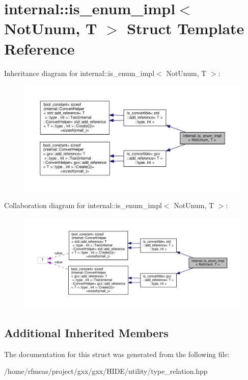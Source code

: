 \hypertarget{structinternal_1_1is__enum__impl}{}\section{internal\+:\+:is\+\_\+enum\+\_\+impl$<$ Not\+Unum, T $>$ Struct Template Reference}
\label{structinternal_1_1is__enum__impl}


Inheritance diagram for internal\+:\+:is\+\_\+enum\+\_\+impl$<$ Not\+Unum, T $>$\+:
\nopagebreak
\begin{figure}[H]
\begin{center}
\leavevmode
\includegraphics[width=350pt]{structinternal_1_1is__enum__impl__inherit__graph}
\end{center}
\end{figure}


Collaboration diagram for internal\+:\+:is\+\_\+enum\+\_\+impl$<$ Not\+Unum, T $>$\+:
\nopagebreak
\begin{figure}[H]
\begin{center}
\leavevmode
\includegraphics[width=350pt]{structinternal_1_1is__enum__impl__coll__graph}
\end{center}
\end{figure}
\subsection*{Additional Inherited Members}


The documentation for this struct was generated from the following file\+:\begin{DoxyCompactItemize}
\item 
/home/rfmeas/project/gxx/gxx/\+H\+I\+D\+E/utility/type\+\_\+relation.\+hpp\end{DoxyCompactItemize}
